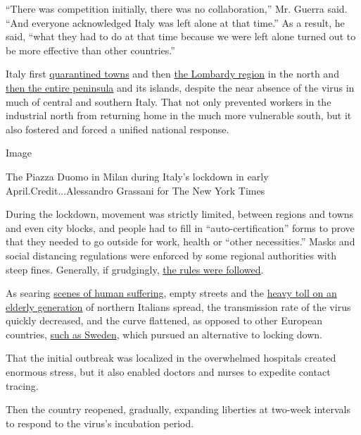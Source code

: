 ``There was competition initially, there was no collaboration,'' Mr.
Guerra said. ``And everyone acknowledged Italy was left alone at that
time.'' As a result, he said, ``what they had to do at that time because
we were left alone turned out to be more effective than other
countries.''

Italy first
\href{https://www.nytimes.com/2020/02/23/world/europe/italy-coronavirus.html}{quarantined
towns} and then
\href{https://www.nytimes.com/2020/03/07/world/europe/coronavirus-italy.html}{the
Lombardy region} in the north and
\href{https://www.nytimes.com/2020/03/09/world/europe/italy-lockdown-coronavirus.html}{then
the entire peninsula} and its islands, despite the near absence of the
virus in much of central and southern Italy. That not only prevented
workers in the industrial north from returning home in the much more
vulnerable south, but it also fostered and forced a unified national
response.

Image

The Piazza Duomo in Milan during Italy's lockdown in early
April.Credit...Alessandro Grassani for The New York Times

During the lockdown, movement was strictly limited, between regions and
towns and even city blocks, and people had to fill in
``auto-certification'' forms to prove that they needed to go outside for
work, health or ``other necessities.'' Masks and social distancing
regulations were enforced by some regional authorities with steep fines.
Generally, if grudgingly,
\href{https://www.nytimes.com/2020/03/10/world/europe/italy-coronavirus-movement-restrictions.html}{the
rules were followed}.

As searing
\href{https://www.nytimes.com/2020/03/16/world/europe/italy-coronavirus-funerals.html}{scenes
of human suffering}, empty streets and the
\href{https://www.nytimes.com/2020/03/04/world/europe/coronavirus-italy-elderly.html}{heavy
toll on an elderly generation} of northern Italians spread, the
transmission rate of the virus quickly decreased, and the curve
flattened, as opposed to other European countries,
\href{https://www.nytimes.com/2020/07/07/business/sweden-economy-coronavirus.html}{such
as Sweden}, which pursued an alternative to locking down.

That the initial outbreak was localized in the overwhelmed hospitals
created enormous stress, but it also enabled doctors and nurses to
expedite contact tracing.

Then the country reopened, gradually, expanding liberties at two-week
intervals to respond to the virus's incubation period.


